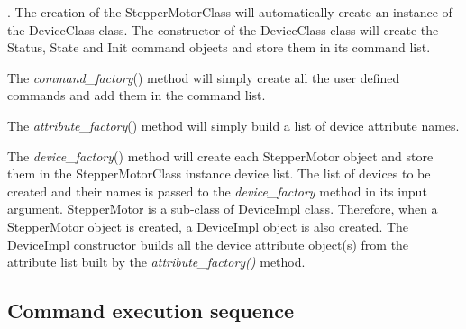  . The creation of the StepperMotorClass will automatically create
an instance of the DeviceClass class. The constructor of the DeviceClass
class will create the Status, State and
Init command objects and store them in its command list.

The \emph{command\_factory}() method will simply create all the user
defined commands and add them in the command list.

The \emph{attribute\_factory}() method will simply build a list of
device attribute names.

The \emph{device\_factory}() method will create each StepperMotor
object and store them in the StepperMotorClass instance device list.
The list of devices to be created and their names is passed to the
\emph{device\_factory} method in its input argument. StepperMotor
is a sub-class of DeviceImpl class. Therefore, when a StepperMotor
object is created, a DeviceImpl object is also created. The DeviceImpl
constructor builds all the device attribute object(s) from the attribute
list built by the \emph{attribute\_factory()} method.

\subsection{Command execution sequence}

